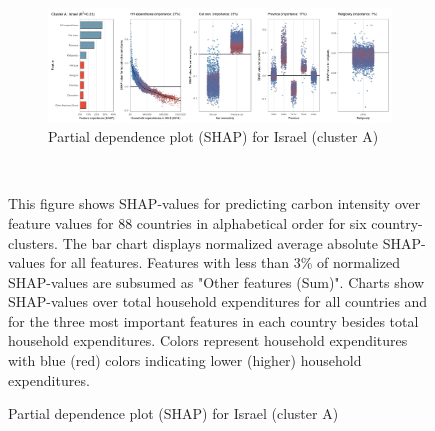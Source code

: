 \begin{figure}[ht!]
    \vspace{0.5cm}
   \begin{subfigure}[b]{\textwidth}
   \centering
         \caption{Partial dependence plot (SHAP) for Israel (cluster A)}
         \label{fig:5b_ISR}
         \includegraphics[width=\textwidth]{Figure 5b/Figure_5b_ISR}
         \end{subfigure}
    \\
    \vspace{0.5cm}
   
    \begin{subcaption2}
     This figure shows SHAP-values for predicting carbon intensity over feature values for 88 countries in alphabetical order for six country-clusters. The bar chart displays normalized average absolute SHAP-values for all features. Features with less than 3\% of normalized SHAP-values are subsumed as "Other features (Sum)". Charts show SHAP-values over total household expenditures for all countries and for the three most important features in each country besides total household expenditures. Colors represent household expenditures with blue (red) colors indicating lower (higher) household expenditures.
     \end{subcaption2}
\end{figure}

